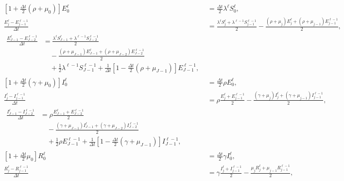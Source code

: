 \documentclass[USenglish]{article}
\begin{document}
\begin{subequations}
\begin{align}
    \\
    \left[1 + \frac{\Delta t}{2} (\rho + \mu_0)\right] E_0^{\ell}
    &= \frac{\Delta t}{2} \lambda^{\ell} S_0^{\ell},
    \\
    \frac{E_j^{\ell} - E_{j - 1}^{\ell - 1}}{\Delta t} &=
    \frac{\lambda^{\ell} S_j^{\ell} + \lambda^{\ell - 1} S_{j - 1}^{\ell - 1}}{2}
    - \frac{(\rho + \mu_j) E_j^{\ell}
    + (\rho + \mu_{j - 1}) E_{j - 1}^{\ell - 1}}{2},
    \\
    \begin{split}
      \frac{E_{J - 1}^{\ell} - E_{J - 2}^{\ell - 1}}{\Delta t} &=
      \frac{\lambda^{\ell} S_{J - 1}^{\ell}
        + \lambda^{\ell - 1} S_{J - 2}^{\ell - 1}}{2}
      \\ & \quad {}
      - \frac{(\rho + \mu_{J - 1}) E_{J - 1}^{\ell}
        + (\rho + \mu_{J - 2}) E_{J - 2}^{\ell - 1}}{2}
      \\ & \quad {}
      + \frac{1}{2} \lambda^{\ell - 1} S_{J - 1}^{\ell - 1}
      + \frac{1}{\Delta t} \left[
        1 - \frac{\Delta t}{2} (\rho + \mu_{J - 1})
      \right] E_{J - 1}^{\ell - 1},
    \end{split}
    \\
    \left[1 + \frac{\Delta t}{2} (\gamma + \mu_0)\right] I_0^{\ell}
    &= \frac{\Delta t}{2} \rho E_0^{\ell},
    \\
    \frac{I_j^{\ell} - I_{j - 1}^{\ell - 1}}{\Delta t} &=
    \rho \frac{E_j^{\ell} + E_{j - 1}^{\ell - 1}}{2}
    - \frac{(\gamma + \mu_j) I_j^{\ell}
      + (\gamma + \mu_{j - 1}) I_{j - 1}^{\ell - 1}}{2},
    \\
    \begin{split}
      \frac{I_{J - 1}^{\ell} - I_{J - 2}^{\ell - 1}}{\Delta t} &=
      \rho \frac{E_{J - 1}^{\ell} + E_{J - 2}^{\ell - 1}}{2}
      \\ & \quad {}
      - \frac{(\gamma + \mu_{J - 1}) I_{J - 1}^{\ell}
        + (\gamma + \mu_{J - 2}) I_{J - 2}^{\ell - 1}}{2}
      \\ & \quad {}
      + \frac{1}{2} \rho E_{J - 1}^{\ell - 1}
      + \frac{1}{\Delta t} \left[
        1 - \frac{\Delta t}{2} (\gamma + \mu_{J - 1})
      \right] I_{J - 1}^{\ell - 1},
    \end{split}
    \\
    \left[1 + \frac{\Delta t}{2} \mu_0\right] R_0^{\ell}
    &= \frac{\Delta t}{2} \gamma I_0^{\ell},
    \\
    \frac{R_j^{\ell} - R_{j - 1}^{\ell - 1}}{\Delta t} &=
    \gamma \frac{I_j^{\ell} + I_{j - 1}^{\ell - 1}}{2}
    - \frac{\mu_j R_j^{\ell} + \mu_{j - 1} R_{j - 1}^{\ell - 1}}{2},

\end{align}
\end{subequations}
\end{document}
